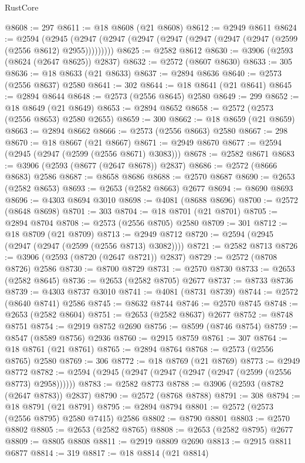\begin{lexlean}{RustCore}
\begin{coremodule}
@8608 := 297
@8611 := @18 @8608 (@21 @8608)
@8612 := @2949 @8611
@8624 := @2594
    (@2945 (@2947 (@2947 (@2947 (@2947 (@2947 (@2947 (@2947 (@2599 (@2556 @8612) @2955)))))))))
@8625 := @2582 @8612
@8630 := @3906 (@2593 (@8624 (@2647 @8625)) @2837)
@8632 := @2572 (@8607 @8630)
@8633 := 305
@8636 := @18 @8633 (@21 @8633)
@8637 := @2894 @8636
@8640 := @2573 (@2556 @8637) @2580
@8641 := 302
@8644 := @18 @8641 (@21 @8641)
@8645 := @2894 @8644
@8648 := @2573 (@2556 @8645) @2580
@8649 := 299
@8652 := @18 @8649 (@21 @8649)
@8653 := @2894 @8652
@8658 := @2572 (@2573 (@2556 @8653) @2580 @2655)
@8659 := 300
@8662 := @18 @8659 (@21 @8659)
@8663 := @2894 @8662
@8666 := @2573 (@2556 @8663) @2580
@8667 := 298
@8670 := @18 @8667 (@21 @8667)
@8671 := @2949 @8670
@8677 := @2594 (@2945 (@2947 (@2599 (@2556 @8671) @3083)))
@8678 := @2582 @8671
@8683 := @3906 (@2593 (@8677 (@2647 @8678)) @2837)
@8686 := @2572 (@8666 @8683) @2586
@8687 := @8658 @8686
@8688 := @2570 @8687
@8690 := @2653 (@2582 @8653)
@8693 := @2653 (@2582 @8663) @2677
@8694 := @8690 @8693
@8696 := @4303 @8694 @3010
@8698 := @4081 (@8688 @8696)
@8700 := @2572 (@8648 @8698)
@8701 := 303
@8704 := @18 @8701 (@21 @8701)
@8705 := @2894 @8704
@8708 := @2573 (@2556 @8705) @2580
@8709 := 301
@8712 := @18 @8709 (@21 @8709)
@8713 := @2949 @8712
@8720 := @2594 (@2945 (@2947 (@2947 (@2599 (@2556 @8713) @3082))))
@8721 := @2582 @8713
@8726 := @3906 (@2593 (@8720 (@2647 @8721)) @2837)
@8729 := @2572 (@8708 @8726) @2586
@8730 := @8700 @8729
@8731 := @2570 @8730
@8733 := @2653 (@2582 @8645)
@8736 := @2653 (@2582 @8705) @2677
@8737 := @8733 @8736
@8739 := @4303 @8737 @3010
@8741 := @4081 (@8731 @8739)
@8744 := @2572 (@8640 @8741) @2586
@8745 := @8632 @8744
@8746 := @2570 @8745
@8748 := @2653 (@2582 @8604)
@8751 := @2653 (@2582 @8637) @2677
@8752 := @8748 @8751
@8754 := @2919 @8752 @2690
@8756 := @8599 (@8746 @8754)
@8759 := @8547 (@8589 @8756) @2936
@8760 := @2915 @8759
@8761 := 307
@8764 := @18 @8761 (@21 @8761)
@8765 := @2894 @8764
@8768 := @2573 (@2556 @8765) @2580
@8769 := 306
@8772 := @18 @8769 (@21 @8769)
@8773 := @2949 @8772
@8782 := @2594 (@2945 (@2947 (@2947 (@2947 (@2947 (@2599 (@2556 @8773) @2958))))))
@8783 := @2582 @8773
@8788 := @3906 (@2593 (@8782 (@2647 @8783)) @2837)
@8790 := @2572 (@8768 @8788)
@8791 := 308
@8794 := @18 @8791 (@21 @8791)
@8795 := @2894 @8794
@8801 := @2572 (@2573 (@2556 @8795) @2580 @7415) @2586
@8802 := @8790 @8801
@8803 := @2570 @8802
@8805 := @2653 (@2582 @8765)
@8808 := @2653 (@2582 @8795) @2677
@8809 := @8805 @8808
@8811 := @2919 @8809 @2690
@8813 := @2915 @8811 @6877
@8814 := 319
@8817 := @18 @8814 (@21 @8814)

\end{coremodule}
\end{lexlean}
